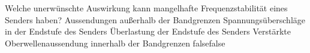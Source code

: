     {Welche unerwünschte Auswirkung kann mangelhafte Frequenzstabilität eines Senders haben?}
    {Aussendungen außerhalb der Bandgrenzen}
    {Spannungsüberschläge in der Endstufe des Senders}
    {Überlastung der Endstufe des Senders}
    {Verstärkte Oberwellenaussendung innerhalb der Bandgrenzen}
    {false}{false}